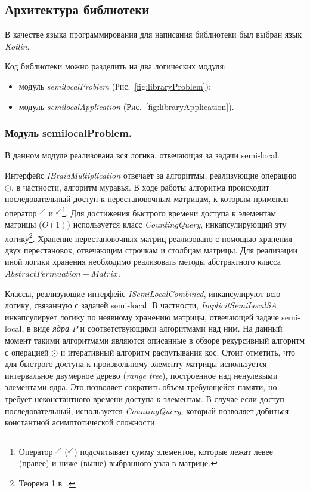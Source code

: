 
\subsection{Архитектура библиотеки}
В качестве языка программирования для написания библиотеки был выбран язык \emph{Kotlin}.

Код библиотеки можно  разделить на два логических модуля:
\begin{itemize}
    \item модуль \emph{semilocalProblem}  (Рис.~\ref{fig:libraryProblem});
    \item модуль \emph{semilocalApplication} (Рис.~\ref{fig:libraryApplication}).
\end{itemize}


\subsubsection{Модуль semilocalProblem.}

В данном модуле реализована вся логика, отвечающая за задачи {semi-local}.

Интерфейс \emph{IBraidMultiplication} отвечает за алгоритмы, реализующие операцию $\odot$, в частности, алгоритм {муравья}.
В ходе работы алгоритма происходит последовательный доступ к перестановочным матрицам, к которым применен оператор $^{\nearrow}$ и $^{\swarrow}$\footnote{Оператор $^{\nearrow}$ ($^{\swarrow}$)  подсчитывает сумму элементов, которые лежат левее (правее) и ниже (выше) выбранного узла в матрице.}.
Для достижения быстрого времени доступа к элементам  матрицы ($O(1)$) используется
класс \emph{CountingQuery}, инкапсулирующий эту логику\footnote{Теорема 1 в~\cite{tiskin2015fast}.}.
% 
Хранение перестановочных матриц реализовано с помощью хранения двух перестановок, отвечающим строчкам и столбцам матрицы.
Для реализации иной логики хранения необходимо реализовать методы абстрактного класса $AbstractPermuation-Matrix$.

Классы, реализующие интерфейс \emph{ISemiLocalCombined}, инкапсулируют всю логику, связанную с задачей {semi-local}.
В частности, \emph{ImplicitSemiLocalSA} инкапсулирует логику по неявному хранению матрицы, отвечающей задаче {semi-local}, в виде \emph{ядра $P$} и соответствующими алгоритмами над ним.
На данный момент такими алгоритмами являются описанные в обзоре рекурсивный алгоритм с операцией $\odot$ и итеративный алгоритм распутывания кос.
Стоит отметить, что для быстрого доступа к произвольному элементу матрицы  используется интервальное двумерное дерево (\emph{range tree}), построенное над ненулевыми элементами ядра.
Это позволяет сократить объем требующейся памяти, но требует неконстантного времени доступа к элементам.
В случае если доступ последовательный, используется  \emph{CountingQuery}, который позволяет добиться константной асимптотической сложности.

